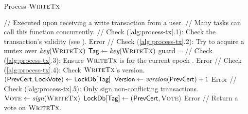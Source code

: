 \begin{algorithm}[t]
    \caption{Process $\textsc{WriteTx}$}
    \label{alg:process-tx}
    \small
    \begin{algorithmic}[1]
        \Statex // Executed upon receiving a write transaction from a user.
        \Statex // Many tasks can call this function concurrently.
        \State // Check (\ref{alg:process-tx}.1): Check the transaction's validity (see ).
        \If{!$\valid{\tx}$} \Return Error \EndIf
        \State
        \State // Check (\ref{alg:process-tx}.2): Try to acquire a mutex over $\emph{key}(\textsc{WriteTx})$
        \State $\textsf{Tag} \gets \emph{key}(\textsc{WriteTx})$
        \State guard =   \label{alg:line:acquire_tx_guard}
        \State
        \State // Check (\ref{alg:process-tx}.3): Ensure $\textsc{WriteTx}$ is for the current epoch \Epoch.
        \If{$\epoch{\tx} \neq \Epoch$} \Return Error \EndIf
        \State
        \State // Check (\ref{alg:process-tx}.4): Check $\textsc{WriteTx}$'s version.
        \State $(\textsf{PrevCert}, \textsf{LockVote}) \gets \textsf{LockDb}[\textsf{Tag}]$  \label{alg:line:load_key}
        \State $\textsf{Version} \gets \emph{version}(\textsf{PrevCert}) + 1$  \label{alg:line:expected_version}
        \If{$\Version \neq \version{\tx}$} \Return Error \EndIf
        \State
        \State // Check (\ref{alg:process-tx}.5): Only sign non-conflicting transactions.
        \State $\textsc{Vote} \gets \emph{sign}(\textsc{WriteTx})$
        \If{$\Vote == \None$} \label{alg:line:check_none_vote}
        \State $\textsf{LockDb}[\textsf{Tag}] \gets (\textsf{PrevCert}, \textsc{Vote})$ \label{alg:line:assign_lock}
        \ElsIf{$\Vote \neq \vote$} \label{alg:line:check_different_vote}
        \State \Return Error \label{alg:line:no_conflict}
        \EndIf
        \State
        \State // Return a vote on $\textsc{WriteTx}$.
        \State \Return \vote
        \EndProcedure
    \end{algorithmic}
\end{algorithm}

